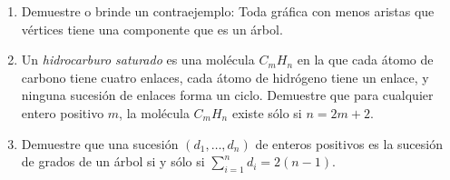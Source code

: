 \documentclass{article}
\begin{document}
\begin{enumerate}
  \item Demuestre o brinde un contraejemplo: Toda
    gr\'afica con menos aristas que v\'ertices tiene
    una componente que es un \'arbol.
    
  \item Un {\em hidrocarburo saturado} es una
    mol\'ecula $C_mH_n$ en la que cada \'atomo de
    carbono tiene cuatro enlaces, cada
    \'atomo de hidr\'ogeno tiene un enlace, y
    ninguna sucesi\'on de enlaces forma un ciclo.
    Demuestre que para cualquier entero positivo
    $m$, la mol\'ecula $C_mH_n$ existe s\'olo si
    $n = 2m + 2$.
    
  \item Demuestre que una sucesi\'on $(d_1, \dots,
    d_n)$ de enteros positivos es la sucesi\'on de
    grados de un \'arbol si y s\'olo si
    $\sum_{i=1}^n d_i = 2(n-1)$.
\end{enumerate}
\end{document}
